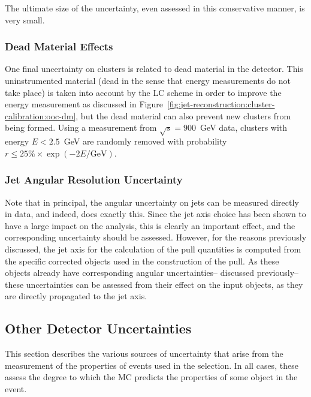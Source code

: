 	The ultimate size of the uncertainty, even assessed in this conservative manner, is very small.

	\subsubsection{Dead Material Effects}

	One final uncertainty on clusters is related to dead material in the detector. This uninstrumented material (dead in the sense that energy measurements do not take place) is taken into account by the LC scheme in order to improve the energy measurement as discussed in Figure~\ref{fig:jet-reconstruction:cluster-calibration:ooc-dm}, but the dead material can also prevent new clusters from being formed. Using a measurement from $\sqrt{s} = 900$~GeV data, clusters with energy $E < 2.5$~GeV  are randomly removed with probability $r\leq 25\%\times \exp(-2E/\text{GeV})$. 

	\subsubsection{Jet Angular Resolution Uncertainty}

	Note that in principal, the angular uncertainty on jets can be measured directly in data, and indeed,  does exactly this. Since the jet axis choice has been shown to have a large impact on the analysis, this is clearly an important effect, and the corresponding uncertainty should be assessed. However, for the reasons previously discussed, the jet axis for the calculation of the pull quantities is computed from the specific corrected objects used in the construction of the pull. As these objects already have corresponding angular uncertainties-- discussed previously-- these uncertainties can be assessed from their effect on the input objects, as they are directly propagated to the jet axis.  

\FloatBarrier

	\subsection{Other Detector Uncertainties}
	\label{chapter:color:uncertainties:other}

	This section describes the various sources of uncertainty that arise from the measurement of the properties of events used in the selection. In all cases, these assess the degree to which the MC predicts the properties of some object in the event.


